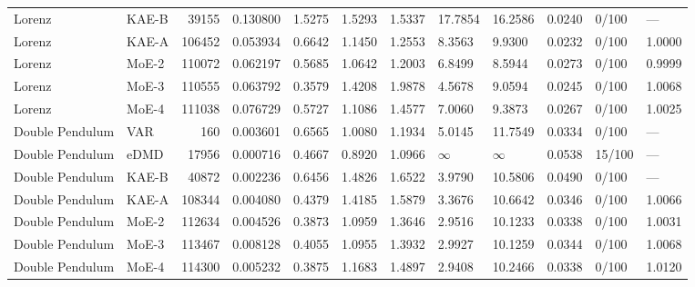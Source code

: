 \begin{tabular}{llrlllllllll}
Lorenz & KAE-B & 39155 & 0.130800 & 1.5275 & 1.5293 & 1.5337 & 17.7854 & 16.2586 & 0.0240 & 0/100 & --- \\
Lorenz & KAE-A & 106452 & 0.053934 & 0.6642 & 1.1450 & 1.2553 & 8.3563 & 9.9300 & 0.0232 & 0/100 & 1.0000 \\
Lorenz & MoE-2 & 110072 & 0.062197 & 0.5685 & 1.0642 & 1.2003 & 6.8499 & 8.5944 & 0.0273 & 0/100 & 0.9999 \\
Lorenz & MoE-3 & 110555 & 0.063792 & 0.3579 & 1.4208 & 1.9878 & 4.5678 & 9.0594 & 0.0245 & 0/100 & 1.0068 \\
Lorenz & MoE-4 & 111038 & 0.076729 & 0.5727 & 1.1086 & 1.4577 & 7.0060 & 9.3873 & 0.0267 & 0/100 & 1.0025 \\
Double Pendulum & VAR & 160 & 0.003601 & 0.6565 & 1.0080 & 1.1934 & 5.0145 & 11.7549 & 0.0334 & 0/100 & --- \\
Double Pendulum & eDMD & 17956 & 0.000716 & 0.4667 & 0.8920 & 1.0966 & $\infty$ & $\infty$ & 0.0538 & 15/100 & --- \\
Double Pendulum & KAE-B & 40872 & 0.002236 & 0.6456 & 1.4826 & 1.6522 & 3.9790 & 10.5806 & 0.0490 & 0/100 & --- \\
Double Pendulum & KAE-A & 108344 & 0.004080 & 0.4379 & 1.4185 & 1.5879 & 3.3676 & 10.6642 & 0.0346 & 0/100 & 1.0066 \\
Double Pendulum & MoE-2 & 112634 & 0.004526 & 0.3873 & 1.0959 & 1.3646 & 2.9516 & 10.1233 & 0.0338 & 0/100 & 1.0031 \\
Double Pendulum & MoE-3 & 113467 & 0.008128 & 0.4055 & 1.0955 & 1.3932 & 2.9927 & 10.1259 & 0.0344 & 0/100 & 1.0068 \\
Double Pendulum & MoE-4 & 114300 & 0.005232 & 0.3875 & 1.1683 & 1.4897 & 2.9408 & 10.2466 & 0.0338 & 0/100 & 1.0120 \\
\bottomrule
\end{tabular}
